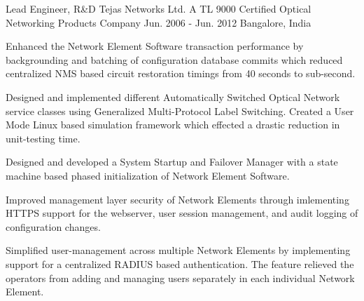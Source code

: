 \begin{cventries}
  \expentry
    {Lead Engineer, R\&D} %
    {Tejas Networks Ltd.} %
    {A TL 9000 Certified Optical Networking Products Company} %
    {Jun. 2006 - Jun. 2012} %
    {Bangalore, India} %
    {
      \begin{cvitems} %
        \item {Enhanced the Network Element Software transaction performance by backgrounding and batching of configuration database commits which reduced centralized NMS based circuit restoration timings from 40 seconds to sub-second.}
        \item {Designed and implemented different Automatically Switched Optical Network service classes using Generalized Multi-Protocol Label Switching. Created a User Mode Linux based simulation framework which effected a drastic reduction in unit-testing time.}
	\item {Designed and developed a System Startup and Failover Manager with a state machine based phased initialization of Network Element Software.}
	\item {Improved management layer security of Network Elements through imlementing HTTPS support for the webserver, user session management, and audit logging of configuration changes.}
	\item {Simplified user-management across multiple Network Elements by implementing support for a centralized RADIUS based authentication. The feature relieved the operators from adding and managing users separately in each individual Network Element.}
      \end{cvitems}
    }

\end{cventries}
